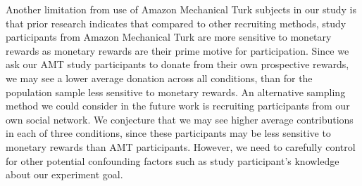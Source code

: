 \begin{description}[leftmargin=\parindent,topsep=0pt,partopsep=3pt,parsep=0pt,itemsep=3pt, listparindent=\parindent]
Another limitation from use of Amazon Mechanical Turk subjects in our study is that prior research \cite{paolacci2010running,paolacci2014inside,kaufmann2011more} indicates that compared to other recruiting methods, study participants from Amazon Mechanical Turk are more sensitive to monetary rewards as monetary rewards are their prime motive for participation. 
Since we ask our AMT study participants to donate from their own prospective rewards, we may see a lower average donation across all conditions, than for the population sample less sensitive to monetary rewards. An alternative sampling method we could consider in the future work is recruiting participants from our own social network. We conjecture that we may see higher average contributions in each of three conditions, since these participants may be less sensitive to monetary rewards than AMT participants. However, we need to carefully control for other potential confounding factors such as study participant's knowledge about our experiment goal. 


\end{description}
